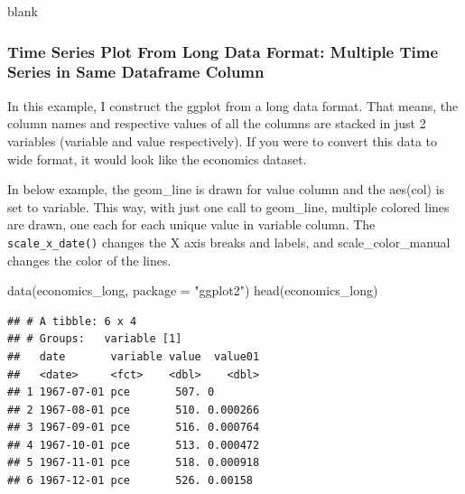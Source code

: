 \documentclass[a4paper]{article}
\newenvironment{Shaded}{}{}
\newcommand{\KeywordTok}[1]{\textcolor[rgb]{0.00,0.00,1.00}{#1}}
\newcommand{\DataTypeTok}[1]{#1}
\newcommand{\StringTok}[1]{\textcolor[rgb]{0.00,0.50,0.50}{#1}}
\newcommand{\NormalTok}[1]{#1}
\begin{document}
\newpage

blank

\newpage

\subsubsection{Time Series Plot From Long Data Format: Multiple Time
Series in Same Dataframe
Column}\label{time-series-plot-from-long-data-format-multiple-time-series-in-same-dataframe-column}

In this example, I construct the ggplot from a long data format. That
means, the column names and respective values of all the columns are
stacked in just 2 variables (variable and value respectively). If you
were to convert this data to wide format, it would look like the
economics dataset.

In below example, the geom\_line is drawn for value column and the
aes(col) is set to variable. This way, with just one call to geom\_line,
multiple colored lines are drawn, one each for each unique value in
variable column. The \texttt{scale\_x\_date()} changes the X axis breaks
and labels, and scale\_color\_manual changes the color of the lines.

\begin{Shaded}
\begin{Highlighting}[]
\KeywordTok{data}\NormalTok{(economics_long, }\DataTypeTok{package =} \StringTok{"ggplot2"}\NormalTok{)}
\KeywordTok{head}\NormalTok{(economics_long)}
\end{Highlighting}
\end{Shaded}

\begin{verbatim}
## # A tibble: 6 x 4
## # Groups:   variable [1]
##   date       variable value  value01
##   <date>     <fct>    <dbl>    <dbl>
## 1 1967-07-01 pce       507. 0       
## 2 1967-08-01 pce       510. 0.000266
## 3 1967-09-01 pce       516. 0.000764
## 4 1967-10-01 pce       513. 0.000472
## 5 1967-11-01 pce       518. 0.000918
## 6 1967-12-01 pce       526. 0.00158
\end{verbatim}
\end{document}
